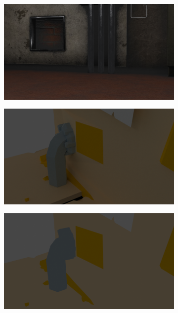 \begin{figure}
\begin{subfigure}{0.24\linewidth}
         \caption{}
         \label{fig:rendering_dataset_piccole_cycles}
    \end{subfigure}
    \hfill
    \begin{subfigure}{0.24\linewidth}
        \centering
         \includegraphics[width=\textwidth]{figures/methods/dataset_compare/piccole_differenze_eevee.png}
         \caption{}
         \label{fig:rendering_dataset_piccole_eevee}
    \end{subfigure}
    \hfill
    \begin{subfigure}{0.24\linewidth}
        \centering
         \includegraphics[width=\textwidth]{figures/methods/dataset_compare/grandi_diff_cycles.png}
         \caption{}
         \label{fig:rendering_dataset_grandi_cycles}
    \end{subfigure}
    \hfill
    \begin{subfigure}{0.24\linewidth}
        \centering
         \includegraphics[width=\textwidth]{figures/methods/dataset_compare/grandi_diff_eevee.png}

\end{subfigure}
\end{figure}
